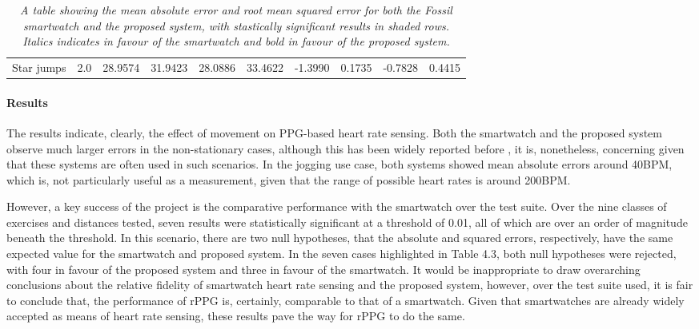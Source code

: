 \begin{table}[]
{\begin{tabular}{cc|c|c|c|c|cccc}
    \multicolumn{1}{c|}{\cellcolor[HTML]{FFFFFF}Star jumps} & 2.0 & 28.9574 & 31.9423 & 28.0886 & 33.4622 & \multicolumn{1}{c|}{\cellcolor[HTML]{FFFFFF}-1.3990} & \multicolumn{1}{c|}{\cellcolor[HTML]{FFFFFF}0.1735} & \multicolumn{1}{c|}{\cellcolor[HTML]{FFFFFF}-0.7828} & 0.4415
    \end{tabular}}
    \label{table:welch-mae}
    \caption{\textit{A table showing the mean absolute error and root mean squared error for both the Fossil smartwatch and the proposed system, with stastically significant results in shaded rows. Italics indicates in favour of the smartwatch and bold in favour of the proposed system.}}
    \end{table}

\paragraph{Results}
The results indicate, clearly, the effect of movement on PPG-based heart rate sensing. Both the smartwatch and the proposed system observe much larger errors in the non-stationary cases, although this has 
been widely reported before \cite{souza2019heart}, it is, nonetheless, concerning given that these systems are often used in such scenarios. In the jogging use case, both systems showed mean absolute errors around 40BPM,
which is, not particularly useful as a measurement, given that the range of possible heart rates is around 200BPM.
\par
However, a key success of the project is the comparative performance with the smartwatch over the test suite. Over the nine classes of exercises and distances tested, seven results were statistically significant at a
threshold of 0.01, all of which are over an order of magnitude beneath the threshold. 
In this scenario, there are two null hypotheses, that the absolute and squared errors, respectively, have the same expected value for the smartwatch and proposed system. 
In the seven cases highlighted in Table 4.3, both null hypotheses were rejected, with four in favour of the proposed system and three in favour of the smartwatch.
It would be inappropriate to draw overarching conclusions about the relative fidelity of smartwatch heart rate sensing and the proposed system, however, over the test suite used, it is fair to conclude 
that, the performance of rPPG is, certainly, comparable to that of a smartwatch. Given that smartwatches are already widely accepted as means of heart rate sensing, these results pave the way for rPPG to do the same.

